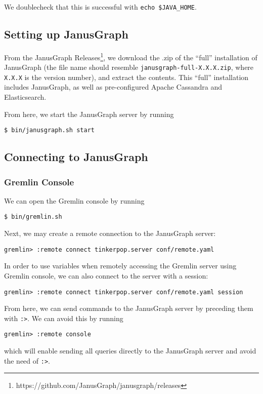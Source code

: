 \documentclass[12pt]{article}
\newcommand{\code}[1]{\colorbox{backcolour}{\texttt{#1}}}
\begin{document}
We doublecheck that this is successful with \code{echo \$JAVA\_HOME}.

\subsection{Setting up JanusGraph}

From the JanusGraph Releases\footnote{https://github.com/JanusGraph/janusgraph/releases}, we download the .zip of the ``full'' installation of JanusGraph (the file name should resemble \code{janusgraph-full-X.X.X.zip}, where \code{X.X.X} is the version number), and extract the contents. This ``full'' installation includes JanusGraph, as well as pre-configured Apache Cassandra and Elasticsearch.

From here, we start the JanusGraph server by running
\begin{lstlisting}[numbers=none]
$ bin/janusgraph.sh start
\end{lstlisting}

\subsection{Connecting to JanusGraph}

\subsubsection{Gremlin Console}

We can open the Gremlin console by running
\begin{lstlisting}[numbers=none]
$ bin/gremlin.sh
\end{lstlisting}

Next, we may create a remote connection to the JanusGraph server:
\begin{lstlisting}[numbers=none]
gremlin> :remote connect tinkerpop.server conf/remote.yaml
\end{lstlisting}

In order to use variables when remotely accessing the Gremlin server using Gremlin console, we can also connect to the server with a session:
\begin{lstlisting}[numbers=none]
gremlin> :remote connect tinkerpop.server conf/remote.yaml session
\end{lstlisting}

From here, we can send commands to the JanusGraph server by preceding them with \code{:>}. We can avoid this by running 
\begin{lstlisting}[numbers=none]
gremlin> :remote console
\end{lstlisting}
which will enable sending all queries directly to the JanusGraph server and avoid the need of \code{:>}.
\end{document}
